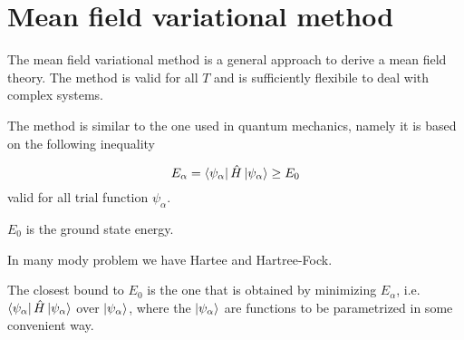 \documentclass[../main/main.tex]{subfiles}
\begin{document}
\section{Mean field variational method}
The mean field variational method is a general approach to derive a mean field theory. The method is valid for all \( T \) and is sufficiently flexibile to deal with complex systems.

 The method is similar to the one used in quantum mechanics, namely it is based on the following inequality

 \begin{equation}
   E_{\alpha } = \bra{\psi _ \alpha } \hat{H} \ket{\psi _ \alpha } \ge E_0
 \end{equation}
valid for all trial function \( \psi _ \alpha  \).
\begin{remark}
\( E_0 \) is the ground state energy.
\end{remark}
\begin{example}
In many mody problem we have Hartee and Hartree-Fock.
\end{example}
The closest bound to \( E_0 \) is the one that is obtained by minimizing \( E_ \alpha  \), i.e. \( \bra{\psi _ \alpha } \hat{H} \ket{\psi _ \alpha } \)  over \( \ket{\psi _ \alpha } \), where the \( \ket{\psi _ \alpha } \) are functions to be parametrized in some convenient way.
\end{document}
